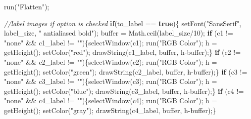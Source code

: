 \documentclass[
  12pt,
  a4paper,
]{book}
\newenvironment{Shaded}{}{}
\newcommand{\CommentTok}[1]{\textcolor[rgb]{0.38,0.63,0.69}{\textit{#1}}}
\newcommand{\ControlFlowTok}[1]{\textcolor[rgb]{0.00,0.44,0.13}{\textbf{#1}}}
\newcommand{\DecValTok}[1]{\textcolor[rgb]{0.25,0.63,0.44}{#1}}
\newcommand{\KeywordTok}[1]{\textcolor[rgb]{0.00,0.44,0.13}{\textbf{#1}}}
\newcommand{\NormalTok}[1]{#1}
\newcommand{\OperatorTok}[1]{\textcolor[rgb]{0.40,0.40,0.40}{#1}}
\newcommand{\StringTok}[1]{\textcolor[rgb]{0.25,0.44,0.63}{#1}}
\begin{document}
\begin{Shaded}
\begin{Highlighting}[]
\NormalTok{run}\OperatorTok{(}\StringTok{"Flatten"}\OperatorTok{);}

\CommentTok{//label images if option is checked}
\ControlFlowTok{if}\OperatorTok{(}\NormalTok{to\_label }\OperatorTok{==} \KeywordTok{true}\OperatorTok{)\{}
\NormalTok{    setFont}\OperatorTok{(}\StringTok{"SansSerif"}\OperatorTok{,}\NormalTok{ label\_size}\OperatorTok{,} \StringTok{" antialiased bold"}\OperatorTok{);}
\NormalTok{    buffer }\OperatorTok{=}\NormalTok{ Math}\OperatorTok{.}\NormalTok{ceil}\OperatorTok{(}\NormalTok{label\_size}\OperatorTok{/}\DecValTok{10}\OperatorTok{);}  
    \ControlFlowTok{if} \OperatorTok{(}\NormalTok{c1 }\OperatorTok{!=} \StringTok{"none"} \OperatorTok{\&\&}\NormalTok{ c1\_label }\OperatorTok{!=} \StringTok{""}\OperatorTok{)\{}\NormalTok{selectWindow}\OperatorTok{(}\NormalTok{c1}\OperatorTok{);}\NormalTok{ run}\OperatorTok{(}\StringTok{"RGB Color"}\OperatorTok{);}\NormalTok{ h }\OperatorTok{=}\NormalTok{ getHeight}\OperatorTok{();}\NormalTok{ setColor}\OperatorTok{(}\StringTok{"red"}\OperatorTok{);}\NormalTok{ drawString}\OperatorTok{(}\NormalTok{c1\_label}\OperatorTok{,}\NormalTok{ buffer}\OperatorTok{,}\NormalTok{ h}\OperatorTok{{-}}\NormalTok{buffer}\OperatorTok{);\}}
    \ControlFlowTok{if} \OperatorTok{(}\NormalTok{c2 }\OperatorTok{!=} \StringTok{"none"} \OperatorTok{\&\&}\NormalTok{ c2\_label }\OperatorTok{!=} \StringTok{""}\OperatorTok{)\{}\NormalTok{selectWindow}\OperatorTok{(}\NormalTok{c2}\OperatorTok{);}\NormalTok{ run}\OperatorTok{(}\StringTok{"RGB Color"}\OperatorTok{);}\NormalTok{ h }\OperatorTok{=}\NormalTok{ getHeight}\OperatorTok{();}\NormalTok{ setColor}\OperatorTok{(}\StringTok{"green"}\OperatorTok{);}\NormalTok{ drawString}\OperatorTok{(}\NormalTok{c2\_label}\OperatorTok{,}\NormalTok{ buffer}\OperatorTok{,}\NormalTok{ h}\OperatorTok{{-}}\NormalTok{buffer}\OperatorTok{);\}}
    \ControlFlowTok{if} \OperatorTok{(}\NormalTok{c3 }\OperatorTok{!=} \StringTok{"none"} \OperatorTok{\&\&}\NormalTok{ c3\_label }\OperatorTok{!=} \StringTok{""}\OperatorTok{)\{}\NormalTok{selectWindow}\OperatorTok{(}\NormalTok{c3}\OperatorTok{);}\NormalTok{ run}\OperatorTok{(}\StringTok{"RGB Color"}\OperatorTok{);}\NormalTok{ h }\OperatorTok{=}\NormalTok{ getHeight}\OperatorTok{();}\NormalTok{ setColor}\OperatorTok{(}\StringTok{"blue"}\OperatorTok{);}\NormalTok{ drawString}\OperatorTok{(}\NormalTok{c3\_label}\OperatorTok{,}\NormalTok{ buffer}\OperatorTok{,}\NormalTok{ h}\OperatorTok{{-}}\NormalTok{buffer}\OperatorTok{);\}}
    \ControlFlowTok{if} \OperatorTok{(}\NormalTok{c4 }\OperatorTok{!=} \StringTok{"none"} \OperatorTok{\&\&}\NormalTok{ c4\_label }\OperatorTok{!=} \StringTok{""}\OperatorTok{)\{}\NormalTok{selectWindow}\OperatorTok{(}\NormalTok{c4}\OperatorTok{);}\NormalTok{ run}\OperatorTok{(}\StringTok{"RGB Color"}\OperatorTok{);}\NormalTok{ h }\OperatorTok{=}\NormalTok{ getHeight}\OperatorTok{();}\NormalTok{ setColor}\OperatorTok{(}\StringTok{"gray"}\OperatorTok{);}\NormalTok{ drawString}\OperatorTok{(}\NormalTok{c4\_label}\OperatorTok{,}\NormalTok{ buffer}\OperatorTok{,}\NormalTok{ h}\OperatorTok{{-}}\NormalTok{buffer}\OperatorTok{);\}}

\end{Highlighting}
\end{Shaded}
\end{document}
